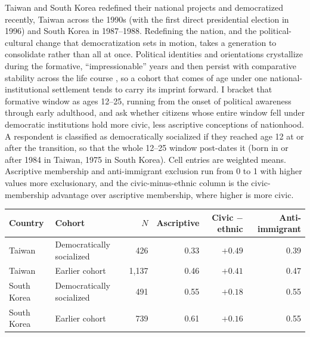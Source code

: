 Taiwan and South Korea redefined their national projects and democratized recently, Taiwan across the 1990s (with the first direct presidential election in 1996) and South Korea in 1987--1988. Redefining the nation, and the political-cultural change that democratization sets in motion, takes a generation to consolidate rather than all at once. Political identities and orientations crystallize during the formative, ``impressionable'' years and then persist with comparative stability across the life course \citep{mannheim1952generations, jennings1981generations, krosnick1989aging, neundorf2017socialization}, so a cohort that comes of age under one national-institutional settlement tends to carry its imprint forward. I bracket that formative window as ages 12--25, running from the onset of political awareness through early adulthood, and ask whether citizens whose entire window fell under democratic institutions hold more civic, less ascriptive conceptions of nationhood. A respondent is classified as democratically socialized if they reached age 12 at or after the transition, so that the whole 12--25 window post-dates it (born in or after 1984 in Taiwan, 1975 in South Korea). Cell entries are weighted means. Ascriptive membership and anti-immigrant exclusion run from 0 to 1 with higher values more exclusionary, and the civic-minus-ethnic column is the civic-membership advantage over ascriptive membership, where higher is more civic.

\needspace{150pt}%
\begin{table}[H]
\centering
\small
\begin{tabular}{llrrrr}
\toprule
Country & Cohort & $N$ & Ascriptive & Civic $-$ ethnic & Anti-immigrant \\
\midrule
Taiwan & Democratically socialized & 426 & 0.33 & $+0.49$ & 0.39 \\
Taiwan & Earlier cohort & 1{,}137 & 0.46 & $+0.41$ & 0.47 \\
South Korea & Democratically socialized & 491 & 0.55 & $+0.18$ & 0.55 \\
South Korea & Earlier cohort & 739 & 0.61 & $+0.16$ & 0.55 \\
\bottomrule
\end{tabular}
\end{table}

